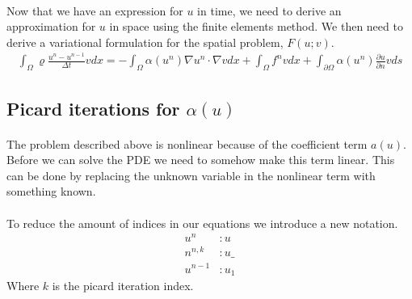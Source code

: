 \documentclass[11pt,a4paper]{article}
\begin{document}
\paragraph*{}
Now that we have an expression for $u$ in time, we need to derive an approximation for $u$ in space using the finite elements method. We then need to derive a variational formulation for the spatial problem,  $F(u;v)$.
\begin{align}
\int_\Omega \varrho\frac{u^n-u^{n-1}}{\Delta t}vdx = -\int_\Omega\alpha(u^n)\nabla u^n \cdot \nabla v dx + \int_\Omega f^n v dx + \int_{\partial\Omega} \alpha(u^{n})\frac{\partial u}{\partial n}vds
\end{align}
\subsection{Picard iterations for $\alpha(u)$}
\paragraph*{}
The problem described above is nonlinear because of the coefficient term $a(u)$. Before we can solve the PDE we need to somehow make this term linear. This can be done by replacing the unknown variable in the nonlinear term with something known.
\paragraph*{}
To reduce the amount of indices in our equations we introduce a new notation.
\begin{align*}
u^n &: u \\
n^{n,k} &: u\_ \\
u^{n-1} &: u_1
\end{align*}
Where $k$ is the picard iteration index. 
\end{document}

